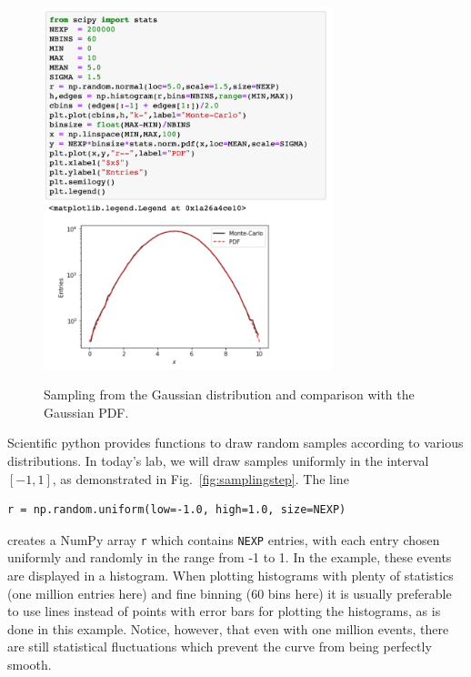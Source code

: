\begin{figure}[htbp]
\begin{center}
\includegraphics[width=0.75\textwidth]{figs/labs/uncertainties/gaussian.png}\\ 
\end{center}
\caption{\label{fig:samplinggauss} Sampling from the Gaussian distribution and comparison with the Gaussian PDF.}
\end{figure}

Scientific python provides functions to draw random samples according
to various distributions.  In today's lab, we will draw samples
uniformly in the interval $[-1,1]$, as demonstrated in Fig.~\ref{fig:samplingstep}.   The line
\begin{verbatim}
r = np.random.uniform(low=-1.0, high=1.0, size=NEXP)
\end{verbatim}
creates a NumPy array {\tt r} which contains {\tt NEXP} entries, with
each entry chosen uniformly and randomly in the range from -1 to 1.
In the example, these events are displayed in a histogram.  When
plotting histograms with plenty of statistics (one million entries
here) and fine binning (60 bins here) it is usually preferable to use
lines instead of points with error bars for plotting the histograms,
as is done in this example.  Notice, however, that even with one
million events, there are still statistical fluctuations which prevent
the curve from being perfectly smooth.

